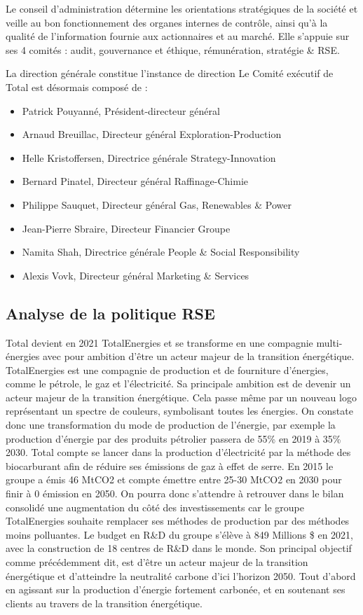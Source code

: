 \documentclass[12pt]{article}
\begin{document}
Le conseil d'administration détermine les orientations stratégiques de la société et veille au bon fonctionnement des organes internes de contrôle, ainsi qu'à la qualité de l'information fournie aux actionnaires et au marché. Elle s'appuie sur ses 4 comités : audit, gouvernance et éthique, rémunération, stratégie \& RSE.

La direction générale constitue l'instance de direction 
Le Comité exécutif de Total est désormais composé de :
\begin{itemize}
    \item Patrick Pouyanné, Président-directeur général
    \item Arnaud Breuillac, Directeur général Exploration-Production
    \item Helle Kristoffersen, Directrice générale Strategy-Innovation
    \item Bernard Pinatel, Directeur général Raffinage-Chimie
    \item Philippe Sauquet, Directeur général Gas, Renewables \& Power
    \item Jean-Pierre Sbraire, Directeur Financier Groupe
    \item Namita Shah, Directrice générale People \& Social Responsibility
    \item Alexis Vovk, Directeur général Marketing \& Services
\end{itemize}
\subsection{Analyse de la politique RSE}
Total devient en 2021 TotalEnergies et se transforme en une compagnie multi-énergies avec pour ambition d'être 
un acteur majeur de la transition énergétique. TotalEnergies est une compagnie de production et de fourniture
d'énergies, comme le pétrole, le gaz et l'électricité. Sa principale ambition est de devenir un acteur majeur 
de la transition énergétique. Cela passe même par un nouveau logo représentant un spectre de couleurs,
symbolisant toutes les énergies. On constate donc une transformation du mode de production de l'énergie, par 
exemple la production d'énergie par des produits pétrolier passera de 55\% en 2019 à  35\% 2030. Total compte 
se lancer dans la production d'électricité par la méthode des biocarburant afin de réduire ses émissions de 
gaz à effet de serre. En 2015 le groupe a émis 46 MtCO2 et compte émettre entre 25-30 MtCO2 en 2030 pour finir 
à 0 émission en 2050. On pourra donc s'attendre à retrouver dans le bilan consolidé une augmentation du côté 
des investissements car le groupe TotalEnergies souhaite remplacer ses méthodes de production par des méthodes 
moins polluantes. 
Le budget en R\&D du groupe s'élève à 849 Millions \$ en 2021, avec la construction de 18 centres de R\&D dans 
le monde. Son principal objectif comme précédemment dit, est d'être un acteur majeur de la transition 
énergétique et d'atteindre la neutralité carbone d'ici l'horizon 2050. Tout d'abord en agissant sur la 
production d'énergie fortement carbonée, et en soutenant ses clients au travers de la transition énergétique.
\end{document}
